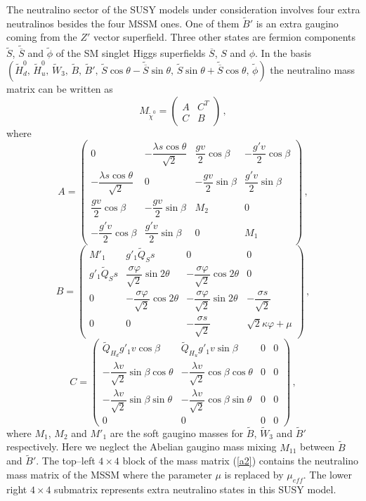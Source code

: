 \documentclass[12pt,a4paper]{article}
\newcommand{\be}{\begin{equation}}
\newcommand{\ee}{\end{equation}}
\newcommand{\ba}{\begin{array}}
\newcommand{\ea}{\end{array}}
\begin{document}
\begin{appendix}
The neutralino sector of the SUSY models under consideration involves four extra neutralinos besides
the four MSSM ones. One of them $\tilde{B}'$ is an extra gaugino coming from the $Z'$ vector superfield.
Three other states are fermion components $\tilde{S}$, $\tilde{\overline{S}}$ and $\tilde{\phi}$
of the SM singlet Higgs superfields $\overline{S}$, $S$ and $\phi$. In the basis
$(\tilde{H}^0_d,\,\tilde{H}^0_u,\,\tilde{W}_3,\,\tilde{B},\,\tilde{B}',\,\tilde{S}\cos\theta-\tilde{\overline{S}}\sin\theta,\,\tilde{S}\sin\theta+\tilde{\overline{S}}\cos\theta,\,\tilde{\phi})$
the neutralino mass matrix can be written as
\be
M_{\tilde{\chi}^0}=
\left(
\ba{cc}
A & C^{T}\\[2mm]
C & B
\ea
\right)\,,
\label{a2}
\ee
where
\be
A=
\left(
\ba{cccc}
0 & -\dfrac{\lambda s \cos\theta}{\sqrt{2}} & \dfrac{gv}{2}\cos\beta & -\dfrac{g'v}{2}\cos\beta \\[3mm]
-\dfrac{\lambda s \cos\theta}{\sqrt{2}} & 0 & -\dfrac{gv}{2}\sin\beta & \dfrac{g'v}{2}\sin\beta \\[3mm]
\dfrac{gv}{2}\cos\beta & -\dfrac{gv}{2}\sin\beta & M_2 & 0\\[3mm]
-\dfrac{g'v}{2}\cos\beta & \dfrac{g'v}{2}\sin\beta & 0 & M_1
\ea
\right)\,,
\label{a3}
\ee
\vspace{3mm}
\be
B=
\left(
\ba{cccc}
M'_1 & g'_1 \tilde{Q}_S s & 0 & 0 \\[3mm]
g'_1 \tilde{Q}_S s & \dfrac{\sigma\varphi}{\sqrt{2}}\sin 2\theta & -\dfrac{\sigma\varphi}{\sqrt{2}}\cos 2\theta & 0 \\[3mm]
0 & -\dfrac{\sigma\varphi}{\sqrt{2}}\cos 2\theta & -\dfrac{\sigma\varphi}{\sqrt{2}}\sin 2\theta & -\dfrac{\sigma s}{\sqrt{2}}\\[3mm]
0 & 0 &  -\dfrac{\sigma s}{\sqrt{2}} & \sqrt{2}\kappa\varphi +\mu
\ea
\right)\,,
\label{a4}
\ee
\vspace{3mm}
\be
C=
\left(
\ba{cccc}
\tilde{Q}_{H_d} g'_1 v \cos\beta & \tilde{Q}_{H_u} g'_1 v \sin\beta & 0 & 0 \\[3mm]
-\dfrac{\lambda v}{\sqrt{2}}\sin\beta\cos\theta & -\dfrac{\lambda v}{\sqrt{2}}\cos\beta\cos\theta & 0 & 0 \\[3mm]
-\dfrac{\lambda v}{\sqrt{2}}\sin\beta\sin\theta & -\dfrac{\lambda v}{\sqrt{2}}\cos\beta\sin\theta & 0 & 0\\[3mm]
0 & 0 &  0 & 0
\ea
\right)\,,
\label{a5}
\ee
where $M_1$, $M_2$ and $M'_1$ are the soft gaugino masses for $\tilde{B}$,
$\tilde{W}_3$ and $\tilde{B}'$ respectively. Here we neglect the Abelian
gaugino mass mixing $M_{11}$ between $\tilde{B}$ and $\tilde{B}'$.
The top--left $4\times 4$ block of the mass matrix (\ref{a2}) contains the
neutralino mass matrix of the MSSM where the parameter $\mu$ is replaced
by $\mu_{eff}$. The lower right $4\times 4$ submatrix represents extra
neutralino states in this SUSY model.




\end{appendix}
\end{document}
